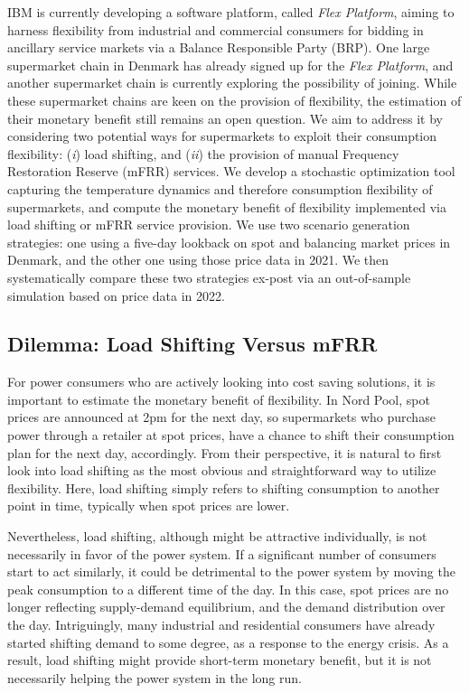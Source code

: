 \documentclass[11pt,a4paper]{article}
\begin{document}
IBM is currently developing a software platform, called \textit{Flex Platform}, aiming to harness flexibility from industrial and commercial consumers for bidding in ancillary service markets via a Balance Responsible Party (BRP). One large supermarket chain in Denmark has already signed up for the \textit{Flex Platform}, and another supermarket chain is currently exploring the possibility of joining.
While these supermarket chains are keen on the provision of flexibility, the estimation of their monetary benefit still remains an open question. We aim to address it by considering two potential ways for supermarkets to exploit their consumption flexibility: (\textit{i}) load shifting, and (\textit{ii}) the provision of manual Frequency Restoration Reserve (mFRR)
services. We  develop  a stochastic optimization tool capturing the temperature dynamics and therefore consumption flexibility of supermarkets, and compute the monetary benefit of flexibility implemented via load shifting or mFRR service provision. We use two scenario generation  strategies: one using a five-day lookback on spot and balancing market prices in Denmark, and the other one using those price data in 2021. We then systematically compare these two strategies ex-post via an out-of-sample simulation based on price data in 2022.


\subsection{Dilemma: Load Shifting Versus mFRR}
%
For power consumers who are actively looking into cost saving solutions, it is important to estimate the monetary benefit of flexibility. In Nord Pool, spot prices are announced at 2pm for the next day, so supermarkets who purchase power through a retailer at  spot prices, have a chance to shift their consumption plan for the next day, accordingly. From their perspective, it is natural to first look into load shifting as the most obvious and straightforward way to utilize flexibility. Here, load shifting simply refers to shifting consumption to another point in time, typically when spot prices are lower.

Nevertheless, load shifting, although might be attractive individually, is not necessarily in  favor of the power system.
If a significant number of consumers start to act similarly, it could be detrimental to the power system by moving the peak consumption to a different time of the day. In this case, spot prices are no longer reflecting supply-demand equilibrium, and the demand distribution over the day.
Intriguingly, many industrial and residential consumers have already started shifting demand to some degree, as a response to the energy crisis.
As a result, load shifting might provide short-term monetary benefit, but it is not necessarily helping the power system in the long run.
\end{document}
